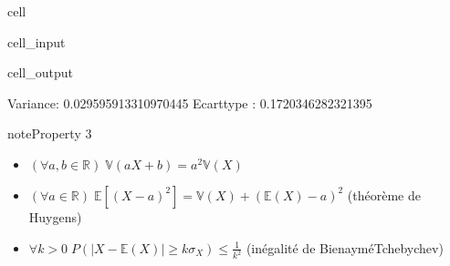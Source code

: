 \documentclass[letterpaper,10pt,french]{sphinxmanual}
\begin{document}
\begin{sphinxuseclass}{cell}
\begin{sphinxuseclass}{cell_input}
\begin{sphinxVerbatim}[commandchars=\\\{\}]
   
   
   
   
 
      
           
  
   
 
 
\end{sphinxVerbatim}

\end{sphinxuseclass}
\begin{sphinxuseclass}{cell_output}
\begin{sphinxVerbatim}[commandchars=\\\{\}]
Variance:  0.029595913310970445
Ecart\PYGZhy{}type :  0.1720346282321395
\end{sphinxVerbatim}

\end{sphinxuseclass}
\end{sphinxuseclass}\label{Rappels:property-33}
\begin{sphinxadmonition}{note}{Property 3}


\begin{itemize}
\item {} 
\sphinxAtStartPar
\((\forall a,b\in\mathbb{R})\; \mathbb{V}(aX+b)= a^2\mathbb{V}(X)\)

\item {} 
\sphinxAtStartPar
\((\forall a\in\mathbb{R})\; \mathbb{E}\left [(X-a)^2\right ] = \mathbb V(X) +(\mathbb{E}(X)-a)^2\) (théorème de Huygens)

\item {} 
\sphinxAtStartPar
\(\forall k>0\; P(|X-\mathbb{E}(X)|\geq k\sigma_X)\leq \frac{1}{k^2}\) (inégalité de Bienaymé\sphinxhyphen{}Tchebychev)

\end{itemize}
\end{sphinxadmonition}
\end{document}
